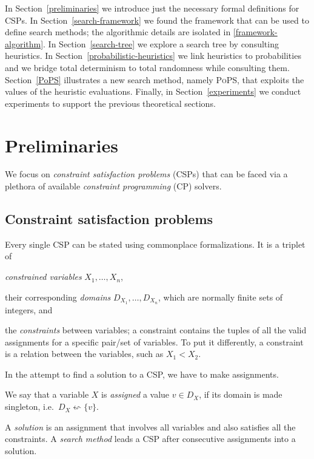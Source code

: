 \documentclass{ws-ijait}
\begin{document}
In Section~\ref{preliminaries} we introduce just the
necessary formal definitions for CSPs. In
Section~\ref{search-framework} we found the framework that
can be used to define search methods; the algorithmic
details are isolated in \ref{framework-algorithm}. In
Section~\ref{search-tree} we explore a search tree by
consulting heuristics. In
Section~\ref{probabilistic-heuristics} we link heuristics
to probabilities and we bridge total determinism to total
randomness while consulting them. Section~\ref{PoPS}
illustrates a new search method, namely \textsc{PoPS}, that
exploits the values of the heuristic evaluations. Finally,
in Section~\ref{experiments} we conduct experiments to
support the previous theoretical sections.


\section{Preliminaries\label{preliminaries}}

We focus on \emph{constraint satisfaction problems}
(CSPs)\cite{Tsang2014} that can be faced via a plethora of
available \emph{constraint programming} (CP)
solvers.\cite{ECLiPSe2017,Ilog2017}

\subsection{Constraint satisfaction problems}

Every single CSP can be stated using commonplace
formalizations.\cite{Russell2010} It is a triplet of
\begin{romanlist}
  \item \emph{constrained variables} $X_1, \ldots, X_n$,
  \item their corresponding \emph{domains} $D_{X_1}, \ldots,
        D_{X_n}$, which are normally finite sets of
        integers, and
  \item the \emph{constraints} between variables; a
        constraint contains the tuples of all the valid
        assignments for a specific pair\slash set of
        variables. To put it differently, a constraint is a
        relation between the variables, such as $X_1 < X_2$.
\end{romanlist}
In the attempt to find a solution to a CSP, we have to make
assignments.
\begin{definition}
  We say that a variable $X$ is \emph{assigned} a value $v
  \in D_X$, if its domain is made singleton, i.e.\ $D_X
  \leftsquigarrow \{v\}$.
\end{definition}
A \emph{solution} is an assignment that involves all
variables and also satisfies all the constraints. A
\emph{search method} leads a CSP after consecutive
assignments into a solution.
\end{document}
